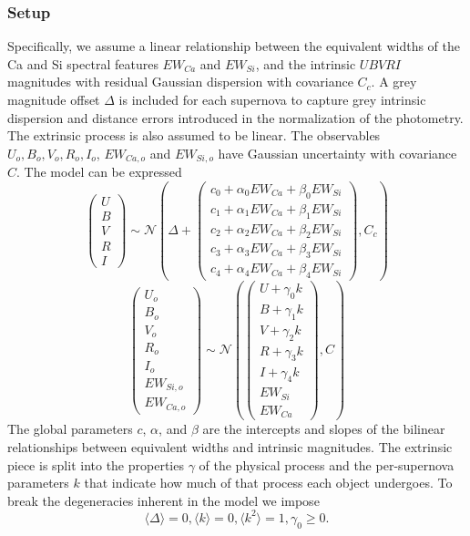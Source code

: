 \documentclass[11pt, oneside]{article}   	%
\begin{document}
\subsubsection{Setup}
Specifically, we assume a linear relationship between the equivalent widths of the Ca and Si spectral features
$EW_{Ca}$ and $EW_{Si}$, and the intrinsic $UBVRI$ magnitudes
with residual Gaussian dispersion with covariance $C_c$.  A grey magnitude offset $\Delta$ is included for each supernova
to capture grey intrinsic dispersion and distance errors introduced in the normalization of the photometry.
The  extrinsic process is also assumed to be linear.  The observables
$U_o, B_o, V_o, R_o, I_o$, $EW_{Ca,o}$ and $EW_{Si,o}$ have Gaussian uncertainty with covariance $C$.  The model can be expressed
\begin{equation*}
\left(
\begin{matrix}
U\\B\\V\\R\\I
\end{matrix}
\right) \sim \mathcal{N}
\left(
\Delta +
\left(
\begin{matrix}
c_0+\alpha_0 EW_{Ca} + \beta_0 EW_{Si} \\
c_1+\alpha_1 EW_{Ca} + \beta_1 EW_{Si}  \\
c_2+\alpha_2 EW_{Ca} + \beta_2 EW_{Si} \\
c_3+\alpha_3 EW_{Ca} + \beta_3 EW_{Si} \\
c_4+\alpha_4 EW_{Ca} + \beta_4 EW_{Si}
\end{matrix}
\right)
,C_{c}
\right)
\end{equation*}
\begin{equation*}
\left(
\begin{matrix}
U_o\\B_o\\ V_o\\R_o\\I_o\\EW_{Si, o}\\ EW_{Ca, o}\end{matrix}
\right) \sim \mathcal{N}
\left(
\left(
\begin{matrix}
U +\gamma_0 k \\B +\gamma_1 k \\V+\gamma_2 k\\R+\gamma_3 k\\I+\gamma_4 k\\
EW_{Si}\\ EW_{Ca}
\end{matrix}
\right)
,C
\right)
\end{equation*}
The global parameters $c$, $\alpha$, and $\beta$ are the intercepts and slopes of the bilinear relationships between equivalent widths
and intrinsic magnitudes.  The extrinsic piece is split into the properties $\gamma$ of the physical process and the per-supernova 
parameters $k$ that indicate how much of that process each object undergoes.  To break the degeneracies inherent in the model we impose
\begin{equation*}
\langle \Delta \rangle=0, \langle k \rangle=0, \langle k^2 \rangle=1, \gamma_0 \ge 0.
\end{equation*}
\end{document}
